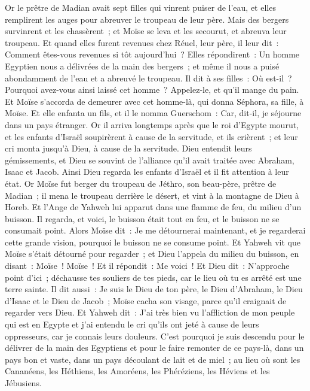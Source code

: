 \begin{multicols}{2}
Or le prêtre de Madian avait sept filles qui vinrent puiser de l'eau, et elles remplirent les auges pour abreuver le troupeau de leur père.
Mais des bergers survinrent et les chassèrent~; et Moïse se leva et les secourut, et abreuva leur troupeau.
Et quand elles furent revenues chez Réuel, leur père, il leur dit~: Comment êtes-vous revenues si tôt aujourd'hui~?
Elles répondirent~: Un homme Egyptien nous a délivrées de la main des bergers~; et même il nous a puisé abondamment de l'eau et a abreuvé le troupeau.
Il dit à ses filles~: Où est-il~? Pourquoi avez-vous ainsi laissé cet homme~? Appelez-le, et qu'il mange du pain.
Et Moïse s'accorda de demeurer avec cet homme-là, qui donna Séphora, sa fille, à Moïse.
Et elle enfanta un fils, et il le nomma Guerschom~: Car, dit-il, je séjourne dans un pays étranger.
Or il arriva longtemps après que le roi d'Egypte mourut, et les enfants d'Israël soupirèrent à cause de la servitude, et ils crièrent~; et leur cri monta jusqu'à Dieu, à cause de la servitude.
Dieu entendit leurs gémissements, et Dieu se souvint de l'alliance qu'il avait traitée avec Abraham, Isaac et Jacob.
Ainsi Dieu regarda les enfants d'Israël et il fit attention à leur état.
\VerseOne{}Or Moïse fut berger du troupeau de Jéthro, son beau-père, prêtre de Madian~; il mena le troupeau derrière le désert, et vint à la montagne de Dieu à Horeb.
Et l'Ange de Yahweh lui apparut dans une flamme de feu, du milieu d'un buisson. Il regarda, et voici, le buisson était tout en feu, et le buisson ne se consumait point.
Alors Moïse dit~: Je me détournerai maintenant, et je regarderai cette grande vision, pourquoi le buisson ne se consume point.
Et Yahweh vit que Moïse s'était détourné pour regarder~; et Dieu l'appela du milieu du buisson, en disant~: Moïse~! Moïse~! Et il répondit~: Me voici~!
Et Dieu dit~: N'approche point d'ici~; déchausse tes souliers de tes pieds, car le lieu où tu es arrêté est une terre sainte.
Il dit aussi~: Je suis le Dieu de ton père, le Dieu d'Abraham, le Dieu d'Isaac et le Dieu de Jacob~; Moïse cacha son visage, parce qu'il craignait de regarder vers Dieu.
 Et Yahweh dit~: J'ai très bien vu l'affliction de mon peuple qui est en Egypte et j'ai entendu le cri qu'ils ont jeté à cause de leurs oppresseurs, car je connais leurs douleurs.
C'est pourquoi je suis descendu pour le délivrer de la main des Egyptiens et pour le faire remonter de ce pays-là, dans un pays bon et vaste, dans un pays découlant de lait et de miel~; au lieu où sont les Cananéens, les Héthiens, les Amoréens, les Phéréziens, les Héviens et les Jébusiens.

\end{multicols}
